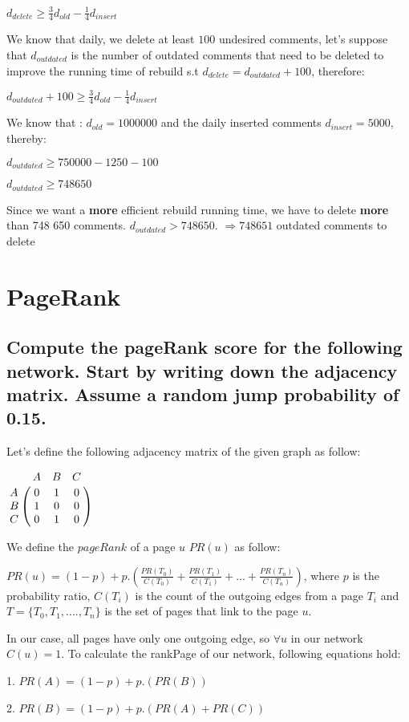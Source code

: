 \documentclass{scrartcl}
\begin{document}
$d_{delete} \geq  \frac{3}{4} d_{old}  - \frac{1}{4}  d_{insert} $

We know that daily, we delete at least $100$ undesired comments, let's suppose that $d_{outdated}$ is the number of outdated comments that need to be deleted to improve the running time of rebuild s.t $d_{delete}= d_{outdated} + 100$, therefore:

$d_{outdated} + 100 \geq \frac{3}{4} d_{old}  - \frac{1}{4}  d_{insert} $

We know that : $d_{old} = 1 000 000$ and the daily inserted comments $d_{insert} = 5000$, thereby:

$d_{outdated} \geq 750 000 - 1 250 - 100$

$d_{outdated} \geq 748 650$

Since we want a \textbf{more} efficient rebuild running time, we have to delete \textbf{more} than 748 650 comments. $d_{outdated} > 748 650$. $ \Rightarrow  748 651$ outdated comments to delete
  

\section{PageRank}

\subsection{Compute the pageRank score for the following network. Start by writing down the adjacency
matrix. Assume a random jump probability of 0.15.}

Let's define the following adjacency matrix of the given graph as follow:

 $
\bordermatrix{
  & A	& B   & C   \cr
A &0& 1 & 0 \cr
B & 1 & 0 &0 \cr
C & 0 & 1 & 0 \cr
}
$  

We define the $pageRank$ of a page $u$ $PR(u)$ as follow:

$PR(u) = (1- p) + p.( \frac{PR(T_0)}{C(T_0)} + \frac{PR(T_1)}{C(T_1)}+ ... + \frac{PR(T_n)}{C(T_n)})$, where $p$ is the probability ratio, $C(T_i)$ is the count of the outgoing edges from a page $T_i$ and $T = \{T_0 , T_1 , .... , T_n\}$ is the set of pages that link to the page $u$.

In our case, all pages have only one outgoing edge, so $\forall u $ in our network $C(u) = 1$. To calculate the rankPage of our network, following equations hold:

1. $PR(A) = (1 - p) + p.( PR(B))$

2. $PR(B) = (1 - p) + p.( PR(A) + PR(C))$
\end{document}
